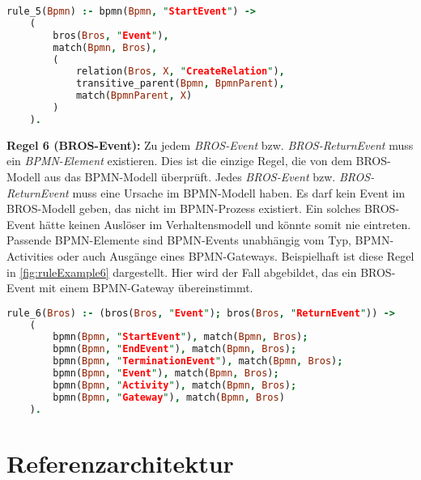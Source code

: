 \begin{lstlisting}[language=Prolog, caption=Formalisierung der Regel 5, label=lst:rule_5]
rule_5(Bpmn) :- bpmn(Bpmn, "StartEvent") ->
    (
        bros(Bros, "Event"),
        match(Bpmn, Bros),
        (
            relation(Bros, X, "CreateRelation"),
            transitive_parent(Bpmn, BpmnParent),
            match(BpmnParent, X)
        )
    ).
\end{lstlisting}

\textbf{Regel 6 (BROS-Event):}
Zu jedem \emph{BROS-Event} bzw. \emph{BROS-ReturnEvent} muss ein \emph{BPMN-Element} existieren.
Dies ist die einzige Regel, die von dem BROS-Modell aus das BPMN-Modell überprüft.
Jedes \emph{BROS-Event} bzw. \emph{BROS-ReturnEvent} muss eine Ursache im BPMN-Modell haben.
Es darf kein Event im BROS-Modell geben, das nicht im BPMN-Prozess existiert.
Ein solches BROS-Event hätte keinen Auslöser im Verhaltensmodell und könnte somit nie eintreten.
Passende BPMN-Elemente sind BPMN-Events unabhängig vom Typ, BPMN-Activities oder auch Ausgänge eines BPMN-Gateways.
Beispielhaft ist diese Regel in \cref{fig:ruleExample6} dargestellt.
Hier wird der Fall abgebildet, das ein BROS-Event mit einem BPMN-Gateway übereinstimmt.

\begin{lstlisting}[language=Prolog, caption=Formalisierung der Regel 6, label=lst:rule_6]
rule_6(Bros) :- (bros(Bros, "Event"); bros(Bros, "ReturnEvent")) ->
    (
        bpmn(Bpmn, "StartEvent"), match(Bpmn, Bros);
        bpmn(Bpmn, "EndEvent"), match(Bpmn, Bros);
        bpmn(Bpmn, "TerminationEvent"), match(Bpmn, Bros);
        bpmn(Bpmn, "Event"), match(Bpmn, Bros);
        bpmn(Bpmn, "Activity"), match(Bpmn, Bros);
        bpmn(Bpmn, "Gateway"), match(Bpmn, Bros)
    ).
\end{lstlisting}

\section{Referenzarchitektur}

